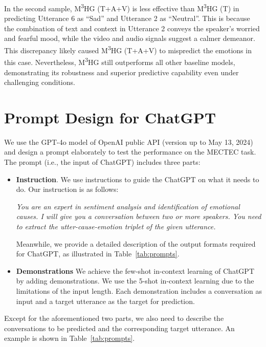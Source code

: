 \documentclass[11pt]{article}
\begin{document}
In the second sample, M\textsuperscript{3}HG (T+A+V) is less effective than M\textsuperscript{3}HG (T) in predicting Utterance 6 as “Sad” and Utterance 2 as “Neutral”. 
This is because the combination of text and context in Utterance 2 conveys the speaker’s worried and fearful mood, while the video and audio signals suggest a calmer demeanor.
This discrepancy likely caused M\textsuperscript{3}HG (T+A+V) to mispredict the emotions in this case. 
Nevertheless, M\textsuperscript{3}HG still outperforms all other baseline models, demonstrating its robustness and superior predictive capability even under challenging conditions.

\section{Prompt Design for ChatGPT}
\label{gpt}

We use the GPT-4o model of OpenAI public API (version up to May 13, 2024) and design a prompt elaborately to test the performance on the MECTEC task. The prompt (i.e., the input of ChatGPT) includes three parts:
\begin{itemize}
    \item \textbf{Instruction}. We use instructions to guide the ChatGPT on what it needs to do. Our instruction is as follows:

    \textit{You are an expert in sentiment analysis and identification of emotional causes. I will give you a conversation between two or more speakers. You need to extract the utter-cause-emotion triplet of the given utterance.}

    Meanwhile, we provide a detailed description of the output formats required for ChatGPT, as illustrated in Table~\ref{tab:prompts}.

    \item \textbf{Demonstrations} We achieve the few-shot in-context learning of ChatGPT by adding demonstrations. 
    We use the 5-shot in-context learning due to the limitations of the input length. 
    Each demonstration includes a conversation as input and a target utterance as the target for prediction.

\end{itemize}
Except for the aforementioned two parts, we also need to describe the conversations to be predicted and the corresponding target utterance.
An example is shown in Table~\ref{tab:prompts}.
\end{document}
